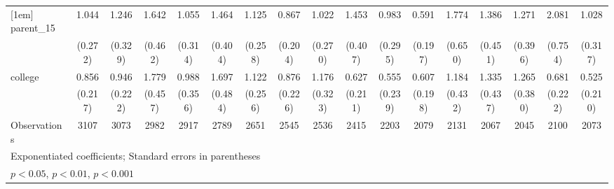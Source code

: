 {\begin{tabular}{l*{16}{c}}
[1em]
parent\_15           &       1.044         &       1.246         &       1.642         &       1.055         &       1.464         &       1.125         &       0.867         &       1.022         &       1.453         &       0.983         &       0.591         &       1.774         &       1.386         &       1.271         &       2.081\sym{*}  &       1.028         \\
                    &     (0.272)         &     (0.329)         &     (0.462)         &     (0.314)         &     (0.404)         &     (0.258)         &     (0.204)         &     (0.270)         &     (0.407)         &     (0.295)         &     (0.197)         &     (0.650)         &     (0.451)         &     (0.396)         &     (0.754)         &     (0.317)         \\
[1em]
college             &       0.856         &       0.946         &       1.779\sym{*}  &       0.988         &       1.697         &       1.122         &       0.876         &       1.176         &       0.627         &       0.555         &       0.607         &       1.184         &       1.335         &       1.265         &       0.681         &       0.525         \\
                    &     (0.217)         &     (0.222)         &     (0.457)         &     (0.356)         &     (0.484)         &     (0.256)         &     (0.226)         &     (0.323)         &     (0.211)         &     (0.239)         &     (0.198)         &     (0.432)         &     (0.437)         &     (0.380)         &     (0.222)         &     (0.210)         \\
\hline
Observations        &        3107         &        3073         &        2982         &        2917         &        2789         &        2651         &        2545         &        2536         &        2415         &        2203         &        2079         &        2131         &        2067         &        2045         &        2100         &        2073         \\
\hline\hline
\multicolumn{17}{l}{\footnotesize Exponentiated coefficients; Standard errors in parentheses}\\
\multicolumn{17}{l}{\footnotesize \sym{*} \(p<0.05\), \sym{**} \(p<0.01\), \sym{***} \(p<0.001\)}\\
\end{tabular}
}
